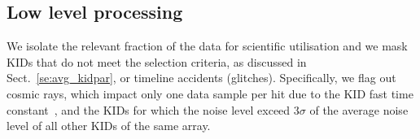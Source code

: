 \subsection{Low level processing}
\label{se:ll_proc}
We isolate the relevant fraction of the data for scientific
utilisation and {\lp we mask KIDs that do not meet the selection criteria, as
discussed in Sect.~\ref{se:avg_kidpar},} or
timeline accidents (glitches). Specifically, we flag out cosmic rays,
which impact only one data sample per hit due to the KID fast time
constant~\citep{Catalano2014}, %
and the KIDs for which the noise level exceed $3\sigma$ of the average
noise level of all other KIDs of the same array.  
%
%

